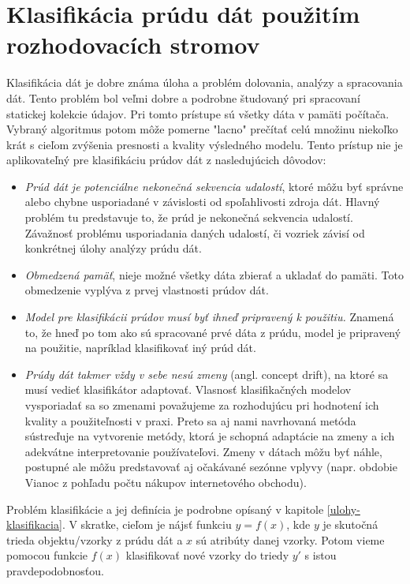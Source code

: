 \chapter{Klasifikácia prúdu dát použitím rozhodovacích stromov}
\label{Klasifikácia prúdu dát použitím rozhodovacích stromov}


Klasifikácia dát je dobre známa úloha a problém dolovania, analýzy a spracovania dát. Tento problém bol veľmi dobre a podrobne študovaný pri spracovaní statickej kolekcie údajov. Pri tomto prístupe sú všetky dáta v pamäti počítača. Vybraný algoritmus potom môže pomerne "lacno" prečítať celú množinu niekoľko krát s cieľom zvýšenia presnosti a kvality výsledného modelu. Tento prístup nie je aplikovateľný pre klasifikáciu prúdov dát z nasledujúcich dôvodov:
\begin{itemize}
	\item \textit{Prúd dát je potenciálne nekonečná sekvencia udalostí}, ktoré môžu byť správne alebo chybne usporiadané v závislosti od spoľahlivosti zdroja dát. Hlavný problém tu predstavuje to, že prúd je nekonečná sekvencia udalostí. Závažnosť problému usporiadania daných udalostí, či vozriek závisí od konkrétnej úlohy analýzy prúdu dát.
	\item \textit{Obmedzená pamäť}, nieje možné všetky dáta zbierať a ukladať do pamäti. Toto obmedzenie vyplýva z prvej vlastnosti prúdov dát.
	\item \textit{Model pre klasifikácii prúdov musí byť ihneď pripravený k použitiu.} Znamená to, že hneď po tom ako sú spracované prvé dáta z prúdu, model je pripravený na použitie, napríklad klasifikovať iný prúd dát.
	\item \textit{Prúdy dát takmer vždy v sebe nesú zmeny} (angl. concept drift), na ktoré sa musí vedieť klasifikátor adaptovať. Vlasnosť klasifikačných modelov vysporiadať sa so zmenami považujeme za rozhodujúcu pri hodnotení ich kvality a použiteľnosti v praxi. Preto sa aj nami navrhovaná metóda sústreďuje na vytvorenie metódy, ktorá je schopná adaptácie na zmeny a ich adekvátne interpretovanie používateľovi. Zmeny v dátach môžu byť náhle, postupné ale môžu predstavovať aj očakávané sezónne vplyvy (napr. obdobie Vianoc z pohľadu počtu nákupov internetového obchodu).
\end{itemize}
Problém klasifikácie a jej definícia je podrobne opísaný v kapitole \ref{ulohy-klasifikacia}. V skratke, cieľom je nájsť funkciu $y = f(x)$, kde $y$ je skutočná trieda objektu/vzorky z prúdu dát a $x$ sú atribúty danej vzorky. Potom vieme pomocou funkcie $f(x)$ klasifikovať nové vzorky do triedy $y'$ s istou pravdepodobnosťou.

